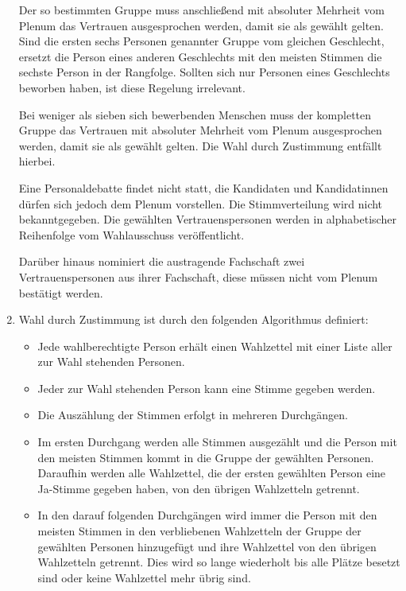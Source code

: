 \begin{enumerate}
Der so bestimmten Gruppe muss anschließend mit absoluter Mehrheit vom
Plenum das Vertrauen ausgesprochen werden, damit sie als gewählt gelten.
Sind die ersten sechs Personen genannter Gruppe vom gleichen Geschlecht,
ersetzt die Person eines anderen Geschlechts mit den meisten Stimmen die
sechste Person in der Rangfolge.
Sollten sich nur Personen eines Geschlechts beworben haben, ist diese
Regelung irrelevant.

Bei weniger als sieben sich bewerbenden Menschen muss der kompletten Gruppe
das Vertrauen mit absoluter Mehrheit vom Plenum ausgesprochen werden,
damit sie als gewählt gelten.
Die Wahl durch Zustimmung entfällt hierbei.

Eine Personaldebatte findet nicht statt, die Kandidaten und Kandidatinnen
dürfen sich jedoch dem Plenum vorstellen.
Die Stimmverteilung wird nicht bekanntgegeben.
Die gewählten Vertrauenspersonen werden in alphabetischer Reihenfolge
vom Wahlausschuss veröffentlicht.

Darüber hinaus nominiert die austragende Fachschaft zwei Vertrauenspersonen
aus ihrer Fachschaft, diese müssen nicht vom Plenum bestätigt werden.

\item Wahl durch Zustimmung ist durch den folgenden Algorithmus definiert:

\begin{itemize}
\item Jede wahlberechtigte Person erhält einen Wahlzettel mit einer
Liste aller zur Wahl stehenden Personen.

\item Jeder zur Wahl stehenden Person kann eine Stimme gegeben werden.

\item Die Auszählung der Stimmen erfolgt in mehreren Durchgängen.

\item Im ersten Durchgang werden alle Stimmen ausgezählt und die Person
mit den meisten Stimmen kommt in die Gruppe der gewählten Personen.
Daraufhin werden alle Wahlzettel, die der ersten gewählten Person
eine Ja-Stimme gegeben haben, von den übrigen Wahlzetteln getrennt.

\item In den darauf folgenden Durchgängen wird immer die Person mit den
meisten Stimmen in den verbliebenen Wahlzetteln der Gruppe der gewählten
Personen hinzugefügt und ihre Wahlzettel von den übrigen Wahlzetteln
getrennt. Dies wird so lange wiederholt bis alle Plätze besetzt sind
oder keine Wahlzettel mehr übrig sind.


\end{itemize}
\end{enumerate}
